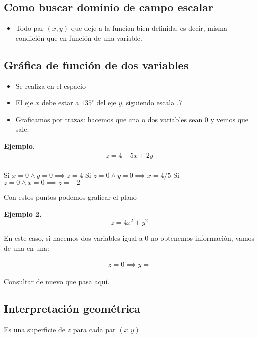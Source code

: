 \subsection{Como buscar dominio de campo escalar}
\begin{itemize}
    \item Todo par \((x,y)\) que deje a la función bien definida,
          es decir, misma condición que en función de una variable.
\end{itemize}

\subsection{Gráfica de función de dos variables}
\begin{itemize}
    \item Se realiza en el espacio
    \item El eje \(x\) debe estar a \(135^{\circ}\) del eje \(y\),
          siguiendo escala .7
    \item Graficamos por trazas:
          hacemos que una o dos variables sean 0 y vemos que sale.
\end{itemize}

\textbf{Ejemplo.}
\begin{align*}
    z = 4 - 5x + 2y \\
\end{align*}

Si \(x = 0 \land y = 0 \implies z = 4\)
Si \(z = 0 \land y = 0 \implies x = 4/5\)
Si \(z = 0 \land x = 0 \implies z = -2\)

Con estos puntos podemos graficar el plano

\textbf{Ejemplo 2.}
\begin{equation*}
    z = 4x^{2} + y^{2}
\end{equation*}

En este caso, si hacemos dos variables igual a 0 no obtenemos información,
vamos de una en una:

\begin{align*}
    z = 0 \implies y =
\end{align*}

Consultar de nuevo que pasa aquí.

\subsection{Interpretación geométrica}

Es una superficie de \(z\) para cada par \((x,y)\)


